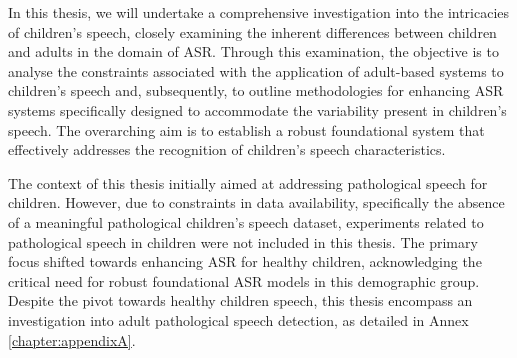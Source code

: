 In this thesis, we will undertake a comprehensive investigation into the intricacies of children's speech, closely examining the inherent differences between children and adults in the domain of ASR. Through this examination, the objective is to analyse the constraints associated with the application of adult-based systems to children's speech and, subsequently, to outline methodologies for enhancing ASR systems specifically designed to accommodate the variability present in children's speech. The overarching aim is to establish a robust foundational system that effectively addresses the recognition of children's speech characteristics.

The context of this thesis initially aimed at addressing pathological speech for children. However, due to constraints in data availability, specifically the absence of a meaningful pathological children's speech dataset, experiments related to pathological speech in children were not included in this thesis. The primary focus shifted towards enhancing ASR for healthy children, acknowledging the critical need for robust foundational ASR models in this demographic group. Despite the pivot towards healthy children speech, this thesis encompass an investigation into adult pathological speech detection, as detailed in Annex \ref{chapter:appendixA}.



